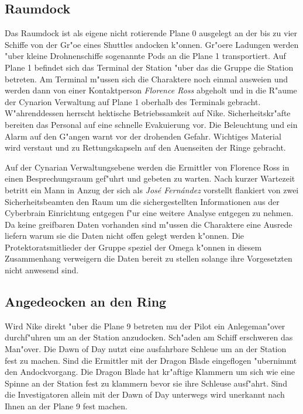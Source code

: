 \subsection{Raumdock}
Das Raumdock ist als eigene nicht rotierende Plane 0 ausgelegt an der bis zu vier Schiffe von der Gr"o\3e eines Shuttles andocken k"onnen. Gr"o\3ere Ladungen werden "uber kleine Drohnenschiffe sogenannte Pods an die Plane 1 transportiert. Auf Plane 1 befindet sich das Terminal der Station "uber das die Gruppe die Station betreten. Am Terminal m"ussen sich die Charaktere noch einmal auswei\3en und werden dann von einer Kontaktperson \emph{Florence Ross} abgeholt und in die R"aume der Cynarion Verwaltung auf Plane 1 oberhalb des Terminals gebracht. W"ahrenddessen herrscht hektische Betriebssamkeit auf Nike. Sicherheitskr"afte bereiten das Personal auf eine schnelle Evakuierung vor. Die Beleuchtung und ein Alarm auf den G"angen warnt vor der drohenden Gefahr. Wichtiges Material wird verstaut und zu Rettungskapseln auf den Au\3enseiten der Ringe gebracht.

Auf der Cynarian Verwaltungsebene werden die Ermittler von Florence Ross in einen Besprechungsraum gef"uhrt und gebeten zu warten. Nach kurzer Wartezeit betritt ein Mann in Anzug der sich als \emph{Jos\'e Fern\'andez} vorstellt flankiert von zwei Sicherheitsbeamten den Raum
um die sichergestellten Informationen aus der Cyberbrain Einrichtung entgegen f"ur eine weitere Analyse entgegen zu nehmen. Da keine greifbaren Daten vorhanden sind m"ussen die Charaktere eine Ausrede liefern warum sie die Daten nicht offen gelegt werden k"onnen. Die Protektoratsmitlieder der Gruppe speziel der Omega k"onnen in diesem Zusammenhang verweigern die Daten bereit zu stellen solange ihre Vorgesetzten nicht anwesend sind.

\subsection{Angedeocken an den Ring}
Wird Nike direkt "uber die Plane 9 betreten mu\3 der Pilot ein Anlegeman"over durchf"uhren um an der Station anzudocken. Sch"aden am Schiff erschweren das Man"over. Die Dawn of Day nutzt eine ausfahrbare Schleu\3e um an der Station fest zu machen. Sind die Ermittler mit der Dragon Blade eingeflogen "ubernimmt \xl{} den Andockvorgang. Die Dragon Blade hat kr"aftige Klammern um sich wie eine Spinne an der Station fest zu klammern bevor sie ihre Schleuse ausf"ahrt. Sind die Investigatoren allein mit der Dawn of Day unterwegs wird \xl{} unerkannt nach Ihnen an der Plane 9 fest machen.

